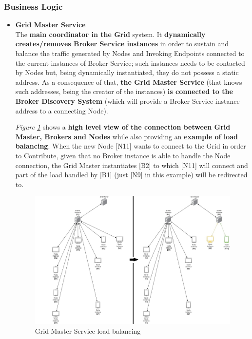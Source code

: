 \subsubsection{Business Logic}
\begin{itemize}
    \item \textbf{Grid Master Service}\\
    The \textbf{main coordinator in the Grid} system. It \textbf{dynamically creates/removes Broker Service instances} in order to sustain and balance the traffic generated by Nodes and Invoking Endpoints connected to the current instances of Broker Service; such instances needs to be contacted by Nodes but, being dynamically instantiated, they do not possess a static address. As a consequence of that, \textbf{the Grid Master Service} (that knows such addresses, being the creator of the instances) \textbf{is connected to the Broker Discovery System} (which will provide a Broker Service instance address to a connecting Node).

    \textit{Figure \ref{fig:master_grid_load_balancing}} shows a \textbf{high level view of the connection between Grid Master, Brokers and Nodes} while also providing an \textbf{example of load balancing}. When the new Node [N11] wants to connect to the Grid in order to Contribute, given that no Broker instance is able to handle the Node connection, the Grid Master instantiates [B2] to which [N11] will connect and part of the load handled by [B1] (just [N9] in this example) will be redirected to.
    \begin{figure}[!ht]
        \centering
        \includegraphics[width=\linewidth]{document/chapters/chapter_6/images/master_grid_load_balancing.jpg}
        \caption{Grid Master Service load balancing}
        \label{fig:master_grid_load_balancing}
    \end{figure}


\end{itemize}
